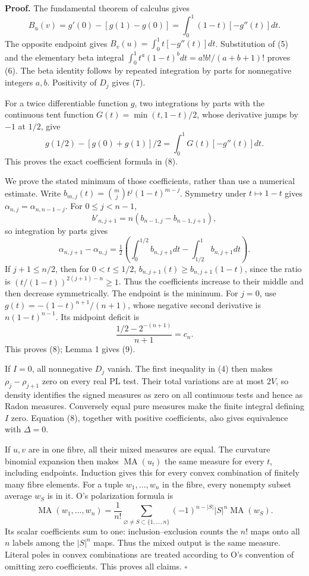 \documentclass[
  11pt,
]{article}
\begin{document}
\textbf{Proof.} The fundamental theorem of calculus gives \[
 B_u(v)=g'(0)-[g(1)-g(0)]=\int_0^1(1-t)[-g''(t)]dt.
\] The opposite endpoint gives \(B_v(u)=\int_0^1t[-g''(t)]dt\).
Substitution of (5) and the elementary beta integral
\(\int_0^1t^a(1-t)^bdt=a!b!/(a+b+1)!\) proves (6). The beta identity
follows by repeated integration by parts for nonnegative integers
\(a,b\). Positivity of \(D_j\) gives (7).

For a twice differentiable function \(g\), two integrations by parts
with the continuous tent function \(G(t)=\min(t,1-t)/2\), whose
derivative jumps by \(-1\) at \(1/2\), give \[
 g(1/2)-[g(0)+g(1)]/2=\int_0^1G(t)[-g''(t)]dt.
\] This proves the exact coefficient formula in (8).

We prove the stated minimum of those coefficients, rather than use a
numerical estimate. Write \(b_{m,j}(t)=\binom mj t^j(1-t)^{m-j}\).
Symmetry under \(t\mapsto1-t\) gives \(\alpha_{n,j}=\alpha_{n,n-1-j}\).
For \(0\leq j<n-1\), \[
 b'_{n,j+1}=n(b_{n-1,j}-b_{n-1,j+1}),
\] so integration by parts gives \[
 \alpha_{n,j+1}-\alpha_{n,j}
 =\tfrac12\left(\int_0^{1/2}b_{n,j+1}dt
                 -\int_{1/2}^1b_{n,j+1}dt\right).
\] If \(j+1\leq n/2\), then for \(0<t\leq1/2\),
\(b_{n,j+1}(t)\geq b_{n,j+1}(1-t)\), since the ratio is
\((t/(1-t))^{2(j+1)-n}\geq1\). Thus the coefficients increase to their
middle and then decrease symmetrically. The endpoint is the minimum. For
\(j=0\), use \(g(t)=-(1-t)^{n+1}/(n+1)\), whose negative second
derivative is \(n(1-t)^{n-1}\). Its midpoint deficit is \[
 \frac{1/2-2^{-(n+1)}}{n+1}=c_n.
\] This proves (8); Lemma 1 gives (9).

If \(I=0\), all nonnegative \(D_j\) vanish. The first inequality in (4)
then makes \(\rho_j-\rho_{j+1}\) zero on every real PL test. Their total
variations are at most \(2V\), so density identifies the signed measures
as zero on all continuous tests and hence as Radon measures. Conversely
equal pure measures make the finite integral defining \(I\) zero.
Equation (8), together with positive coefficients, also gives
equivalence with \(\Delta=0\).

If \(u,v\) are in one fibre, all their mixed measures are equal. The
curvature binomial expansion then makes \(\operatorname{MA}(u_t)\) the
same measure for every \(t\), including endpoints. Induction gives this
for every convex combination of finitely many fibre elements. For a
tuple \(w_1,\ldots,w_n\) in the fibre, every nonempty subset average
\(w_S\) is in it. O's polarization formula is \[
 \operatorname{MA}(w_1,\ldots,w_n)=\frac1{n!}
  \sum_{\varnothing\ne S\subset\{1,\ldots,n\}}
       (-1)^{n-|S|}|S|^n\operatorname{MA}(w_S).
\] Its scalar coefficients sum to one: inclusion--exclusion counts the
\(n!\) maps onto all \(n\) labels among the \(|S|^n\) maps. Thus the
mixed output is the same measure. Literal poles in convex combinations
are treated according to O's convention of omitting zero coefficients.
This proves all claims. \(\square\)
\end{document}
